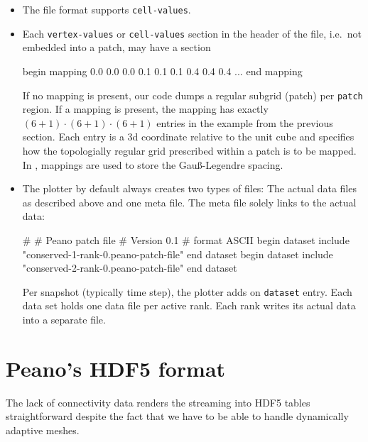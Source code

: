 \begin{itemize}
  \item The file format supports \texttt{cell-values}.
  \item Each \texttt{vertex-values} or \texttt{cell-values} section in the
  header of the file, i.e.~not embedded into a patch, may have a section
  \begin{code}
   begin mapping
     0.0 0.0 0.0
     0.1 0.1 0.1
     0.4 0.4 0.4
     ...
   end mapping
  \end{code} 
  If no mapping is present, our code dumps a regular subgrid (patch) per
  \texttt{patch} region. If a mapping is present, the mapping has exactly $(6+1)
  \cdot (6+1) \cdot (6+1)$ entries in the example from the previous section.
  Each entry is a 3d coordinate relative to the unit cube and specifies how the
  topologially regular grid prescribed within a patch is to be mapped. In
  \exahype, mappings are used to store the Gau\ss -Legendre spacing.
  \item The plotter by default always creates two types of files: The actual
  data files as described above and one meta file. The meta file solely links to
  the actual data:
  \begin{code}
# 
# Peano patch file 
# Version 0.1 
# 
format ASCII
begin dataset
  include "conserved-1-rank-0.peano-patch-file"
end dataset
begin dataset
  include "conserved-2-rank-0.peano-patch-file"
end dataset
  \end{code}
  Per snapshot (typically time step), the plotter adds on \texttt{dataset}
  entry. Each data set holds one data file per active rank. Each rank writes its
  actual data into a separate file. 
\end{itemize}


\section{Peano's HDF5 format}

The lack of connectivity data renders the streaming into HDF5 tables
straightforward despite the fact that we have to be able to handle dynamically
adaptive meshes.
